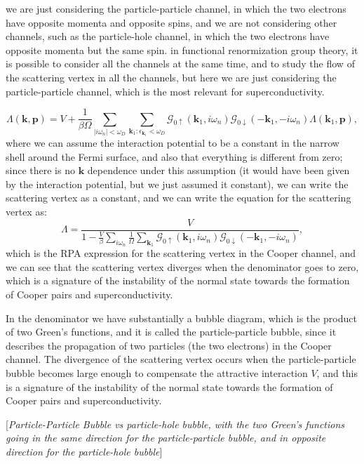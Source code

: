 we are just considering the particle-particle channel, in which the two electrons have opposite momenta and opposite spins, and we are not considering other channels, such as the particle-hole channel, in which the two electrons have opposite momenta but the same spin. in functional renormization group theory, it is possible to consider all the channels at the same time, and to study the flow of the scattering vertex in all the channels, but here we are just considering the particle-particle channel, which is the most relevant for superconductivity.

\[
    \Lambda(\mathbf{k}, \mathbf{p}) = V + \frac{1}{\beta \Omega} \sum_{\vert i \omega_n \vert < \omega_D} \sum_{\mathbf{k}_1 : \epsilon_{\mathbf{k}_1} < \omega_D} \mathcal{G}_{0 \uparrow}(\mathbf{k}_1, i \omega_n) \mathcal{G}_{0 \downarrow}(-\mathbf{k}_1, -i \omega_n) \Lambda(\mathbf{k}_1, \mathbf{p}),
\]
where we can assume the interaction potential to be a constant in the narrow shell around the Fermi surface, and also that everything is different from zero; since there is no \(\mathbf{k}\) dependence under this assumption (it would have been given by the interaction potential, but we just assumed it constant), we can write the scattering vertex as a constant, and we can write the equation for the scattering vertex as:
\[
    \Lambda = \frac{V}{1 - \frac{V}{\beta} \sum_{i \omega_n} \frac{1}{\Omega} \sum_{\mathbf{k}_1} \mathcal{G}_{0 \uparrow}(\mathbf{k}_1, i \omega_n) \mathcal{G}_{0 \downarrow}(-\mathbf{k}_1, -i \omega_n)},
\]
which is the RPA expression for the scattering vertex in the Cooper channel, and we can see that the scattering vertex diverges when the denominator goes to zero, which is a signature of the instability of the normal state towards the formation of Cooper pairs and superconductivity.

In the denominator we have substantially a bubble diagram, which is the product of two Green's functions, and it is called the particle-particle bubble, since it describes the propagation of two particles (the two electrons) in the Cooper channel. The divergence of the scattering vertex occurs when the particle-particle bubble becomes large enough to compensate the attractive interaction \(V\), and this is a signature of the instability of the normal state towards the formation of Cooper pairs and superconductivity.

    [\textit{Particle-Particle Bubble vs particle-hole bubble, with the two Green's functions going in the same direction for the particle-particle bubble, and in opposite direction for the particle-hole bubble}]

